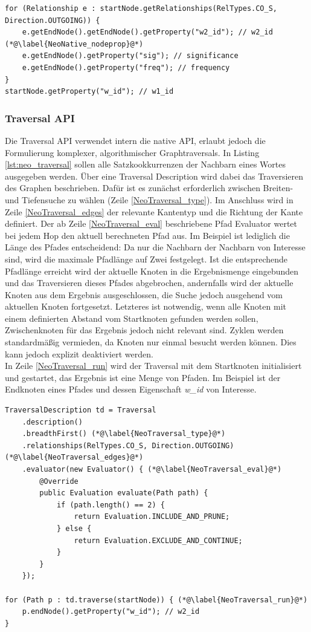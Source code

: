 \documentclass[11pt, a4paper, oneside]{article} %
\begin{document}
\begin{lstlisting}[caption={Verwendung der nativen API},label={lst:neo_abfrage}]
for (Relationship e : startNode.getRelationships(RelTypes.CO_S, Direction.OUTGOING)) {
	e.getEndNode().getEndNode().getProperty("w2_id"); // w2_id (*@\label{NeoNative_nodeprop}@*)
	e.getEndNode().getProperty("sig"); // significance
	e.getEndNode().getProperty("freq"); // frequency
}
startNode.getProperty("w_id"); // w1_id 
\end{lstlisting}
 

\subsubsection{Traversal API}

Die Traversal API verwendet intern die native API, erlaubt jedoch die Formulierung komplexer, algorithmischer Graphtraversals. In Listing \ref{lst:neo_traversal} sollen alle Satzkookkurrenzen der Nachbarn eines Wortes ausgegeben werden. Über eine Traversal Description wird dabei das Traversieren des Graphen beschrieben. Dafür ist es zunächst erforderlich zwischen Breiten- und Tiefensuche zu wählen (Zeile \ref{NeoTraversal_type}). Im Anschluss wird in Zeile \ref{NeoTraversal_edges} der relevante Kantentyp und die Richtung der Kante definiert. Der ab Zeile \ref{NeoTraversal_eval} beschriebene Pfad Evaluator wertet bei jedem Hop den aktuell berechneten Pfad aus. Im Beispiel ist lediglich die Länge des Pfades entscheidend: Da nur die Nachbarn der Nachbarn von Interesse sind, wird die maximale Pfadlänge auf Zwei festgelegt. Ist die entsprechende Pfadlänge erreicht wird der aktuelle Knoten in die Ergebnismenge eingebunden und das Traversieren dieses Pfades abgebrochen, andernfalls wird der aktuelle Knoten aus dem Ergebnis ausgeschlossen, die Suche jedoch ausgehend vom aktuellen Knoten fortgesetzt. Letzteres ist notwendig, wenn alle Knoten mit einem definierten Abstand vom Startknoten gefunden werden sollen, Zwischenknoten für das Ergebnis jedoch nicht relevant sind. Zyklen werden standardmäßig vermieden, da Knoten nur einmal besucht werden können. Dies kann jedoch explizit deaktiviert werden.\\
In Zeile \ref{NeoTraversal_run} wird der Traversal mit dem Startknoten initialisiert und gestartet, das Ergebnis ist eine Menge von Pfaden. Im Beispiel ist der Endknoten eines Pfades und dessen Eigenschaft \textit{w\_id} von Interesse.

\begin{lstlisting}[caption={Verwendung der Traversal API},label={lst:neo_traversal}]
TraversalDescription td = Traversal
	.description()
	.breadthFirst() (*@\label{NeoTraversal_type}@*)
	.relationships(RelTypes.CO_S, Direction.OUTGOING) (*@\label{NeoTraversal_edges}@*)
	.evaluator(new Evaluator() { (*@\label{NeoTraversal_eval}@*)
		@Override
		public Evaluation evaluate(Path path) {
			if (path.length() == 2) {
				return Evaluation.INCLUDE_AND_PRUNE;
			} else {
				return Evaluation.EXCLUDE_AND_CONTINUE;
			}
		}
	});

for (Path p : td.traverse(startNode)) { (*@\label{NeoTraversal_run}@*)
	p.endNode().getProperty("w_id"); // w2_id
}
\end{lstlisting}
\end{document}

